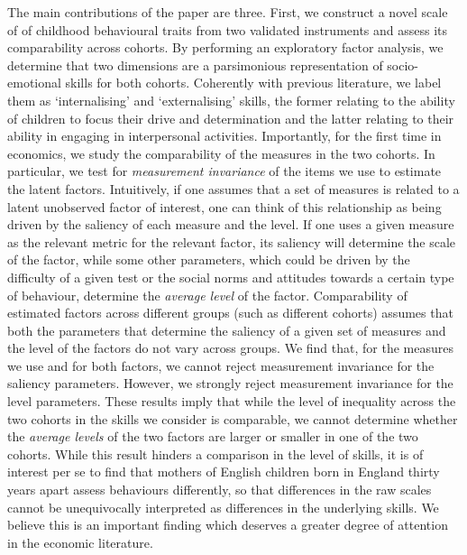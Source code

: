 The main contributions of the paper are three. First, we construct a novel scale of of childhood behavioural traits from two validated instruments and assess its comparability across cohorts. By performing an exploratory factor analysis, we determine that two dimensions are a parsimonious representation of socio-emotional skills for both cohorts. Coherently with previous literature, we label them as `internalising' and `externalising' skills, the former relating to the ability of children to focus their drive and determination and the latter relating to their ability in engaging in interpersonal activities. Importantly, for the first time in economics, we study the comparability of the measures in the two cohorts. In particular, we test for \emph{measurement invariance} of the items we use to estimate the latent factors. Intuitively, if one assumes that a set of measures is related to a latent unobserved factor of interest, one can think of this relationship as being driven by the saliency of each measure and the level. If one uses a given measure as the relevant metric for the relevant factor, its saliency will determine the scale of the factor, while some other parameters, which could be driven by the difficulty of a given test or the social norms and attitudes towards a certain type of behaviour, determine the \emph{average level} of the factor. Comparability of estimated factors across different groups (such as different cohorts) assumes  that both the parameters that determine the saliency of a given set of measures and the level of the factors do not vary across groups. We find that, for the measures we use and for both factors, we cannot reject measurement invariance for the saliency parameters. However, we strongly reject measurement invariance for the level parameters. These results imply that while the level of inequality across the two cohorts in the skills we consider is comparable, we cannot determine whether the \emph{average levels} of the two factors are larger or smaller in one of the two cohorts. While this result hinders a comparison in the level of skills, it is of interest per se to find that mothers of English children born in England thirty years apart assess behaviours differently, so that differences in the raw scales cannot be unequivocally interpreted as differences in the underlying skills. We believe this is an important finding which deserves a greater degree of attention in the economic literature.

